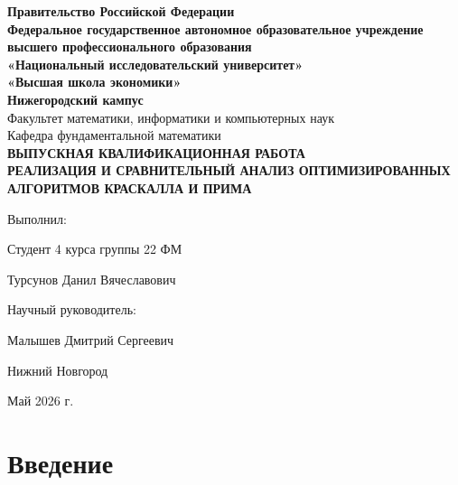 


	\setcounter{page}{1}
	
	\begin{center} 
		\textbf{Правительство Российской Федерации}
		\\ \textbf{Федеральное государственное автономное образовательное учреждение}
		\\ \textbf{высшего профессионального образования}
		\\ \textbf{«Национальный исследовательский университет»}
		\\ \textbf{«Высшая школа экономики»}
		\\ \textbf{Нижегородский кампус}
		\vspace{3cm}
		\\ Факультет математики, информатики и компьютерных наук
		\\ Кафедра фундаментальной математики
		\vspace{3cm}
		\\ \large\textbf{ВЫПУСКНАЯ КВАЛИФИКАЦИОННАЯ РАБОТА}
		\vspace{0.3cm}
		\\ \large\textbf{РЕАЛИЗАЦИЯ И СРАВНИТЕЛЬНЫЙ АНАЛИЗ ОПТИМИЗИРОВАННЫХ АЛГОРИТМОВ КРАСКАЛЛА И ПРИМА}
	\end{center}
	
	\vspace{2cm}\hspace{8cm} Выполнил: 
	\par \hspace{8cm} Студент 4 курса группы 22 ФМ 
	\par \hspace{8cm} Турсунов Данил Вячеславович
	\par \vspace{0.8cm} \hspace{8cm} Научный руководитель:
	\par \hspace{8cm} Малышев Дмитрий Сергеевич
	\begin{center} 
		\vspace{3cm} Нижний Новгород
		\par Май 2026 г.
	\end{center}
	\newpage
	
	\tableofcontents
	\newpage

	\section{Введение}
	
